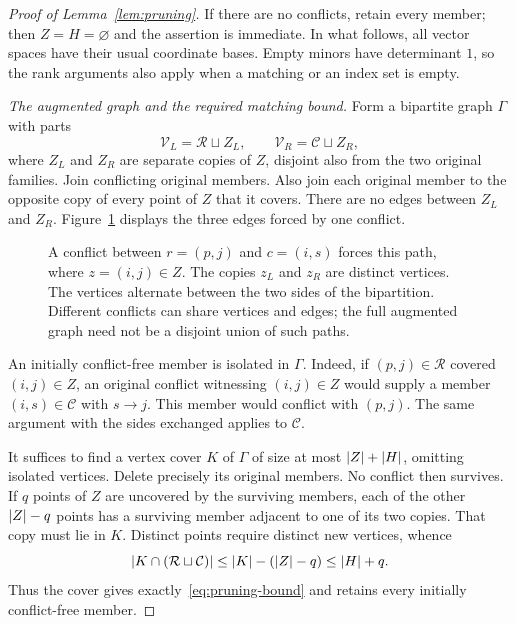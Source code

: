\begin{proof}[Proof of Lemma~\ref{lem:pruning}]
If there are no conflicts, retain every member; then $Z=H=\varnothing$
and the assertion is immediate.  In what follows, all vector spaces have
their usual coordinate bases.  Empty minors have determinant $1$, so the
rank arguments also apply when a matching or an index set is empty.

\medskip\noindent
\emph{The augmented graph and the required matching bound.}
Form a bipartite graph $\Gamma$ with parts
\[
 \mathcal V_L=\mathcal R\sqcup Z_L,
 \qquad
 \mathcal V_R=\mathcal C\sqcup Z_R,
\]
where $Z_L$ and $Z_R$ are separate copies of $Z$, disjoint also from the
two original families.  Join conflicting original members.  Also join
each original member to the opposite copy of every point of $Z$ that it
covers.  There are no edges between $Z_L$ and $Z_R$.
Figure~\ref{fig:pruning} displays the three edges forced by one conflict.

\begin{figure}[!ht]
 \centering
 
 \caption{A conflict between $r=(p,j)$ and $c=(i,s)$ forces this path,
 where $z=(i,j)\in Z$.  The copies $z_L$ and $z_R$ are distinct vertices.
 The vertices alternate between the two sides of the bipartition.
 Different conflicts can share vertices and edges; the full augmented
 graph need not be a disjoint union of such paths.}
 \label{fig:pruning}
\end{figure}

An initially conflict-free member is isolated in $\Gamma$.
Indeed, if $(p,j)\in\mathcal R$ covered $(i,j)\in Z$, an original
conflict witnessing $(i,j)\in Z$ would supply a member
$(i,s)\in\mathcal C$ with $s\to j$.  This member would conflict with
$(p,j)$.  The same argument with the sides exchanged applies to
$\mathcal C$.

It suffices to find a vertex cover $K$ of $\Gamma$ of size at most
$\lvert Z\rvert+\lvert H\rvert$, omitting isolated vertices.  Delete precisely its
original members.  No conflict then survives.  If $q$ points of $Z$ are
uncovered by the surviving members, each of the other $\lvert Z\rvert-q$ points
has a surviving member adjacent to one of its two copies.  That copy
must lie in $K$.  Distinct points require distinct new vertices, whence
\begin{equation}\label{eq:cover-charge}
 \lvert K\cap(\mathcal R\sqcup\mathcal C)\rvert
 \leq \lvert K\rvert-(\lvert Z\rvert-q)\leq\lvert H\rvert+q.
\end{equation}
Thus the cover gives exactly~\eqref{eq:pruning-bound} and retains every
initially conflict-free member.


\end{proof}
